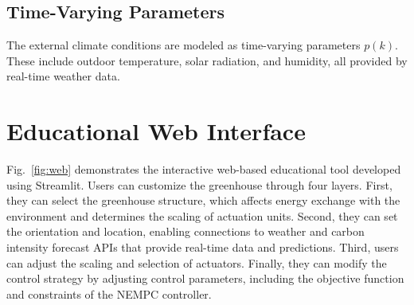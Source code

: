 \documentclass[conference]{IEEEtran}
\begin{document}
\subsection{Time-Varying Parameters}
The external climate conditions are modeled as time-varying parameters \( p(k) \). These include outdoor temperature, solar radiation, and humidity, all provided by real-time weather data.

\section{Educational Web Interface}
Fig.~\ref{fig:web} demonstrates the interactive web-based educational tool developed using Streamlit. Users can customize the greenhouse through four layers. First, they can select the greenhouse structure, which affects energy exchange with the environment and determines the scaling of actuation units. Second, they can set the orientation and location, enabling connections to weather and carbon intensity forecast APIs that provide real-time data and predictions. Third, users can adjust the scaling and selection of actuators. Finally, they can modify the control strategy by adjusting control parameters, including the objective function and constraints of the NEMPC controller.
\end{document}
